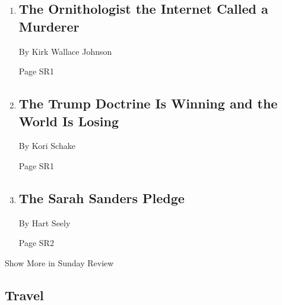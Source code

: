 \begin{enumerate}
\def\labelenumi{\arabic{enumi}.}
\item
  \href{/2018/06/15/opinion/sunday/moustached-kingfisher-internet-harassment.html}{}

  \hypertarget{the-ornithologist-the-internet-called-a-murderer}{%
  \subsection{The Ornithologist the Internet Called a
  Murderer}\label{the-ornithologist-the-internet-called-a-murderer}}

  By Kirk Wallace Johnson

  Page SR1
\item
  \href{/2018/06/15/opinion/sunday/trump-china-america-first.html}{}

  \hypertarget{the-trump-doctrine-is-winning-and-the-world-is-losing}{%
  \subsection{The Trump Doctrine Is Winning and the World Is
  Losing}\label{the-trump-doctrine-is-winning-and-the-world-is-losing}}

  By Kori Schake

  Page SR1
\item
  \href{/2018/06/14/opinion/sunday/sarah-huckabee-sanders-briefings.html}{}

  \hypertarget{the-sarah-sanders-pledge}{%
  \subsection{The Sarah Sanders Pledge}\label{the-sarah-sanders-pledge}}

  By Hart Seely

  Page SR2
\end{enumerate}

Show More in Sunday Review

\hypertarget{travel}{%
\subsection{Travel}\label{travel}}

